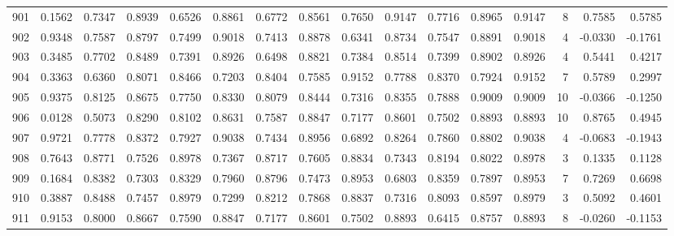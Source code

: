 \begin{tabular}{lrrrrrrrrrrrrrrr}
901 &      0.1562 &  0.7347 &  0.8939 &  0.6526 &  0.8861 &  0.6772 &  0.8561 &  0.7650 &  0.9147 &  0.7716 &   0.8965 &     0.9147 &      8 &                    0.7585 &                     0.5785 \\
902 &      0.9348 &  0.7587 &  0.8797 &  0.7499 &  0.9018 &  0.7413 &  0.8878 &  0.6341 &  0.8734 &  0.7547 &   0.8891 &     0.9018 &      4 &                   -0.0330 &                    -0.1761 \\
903 &      0.3485 &  0.7702 &  0.8489 &  0.7391 &  0.8926 &  0.6498 &  0.8821 &  0.7384 &  0.8514 &  0.7399 &   0.8902 &     0.8926 &      4 &                    0.5441 &                     0.4217 \\
904 &      0.3363 &  0.6360 &  0.8071 &  0.8466 &  0.7203 &  0.8404 &  0.7585 &  0.9152 &  0.7788 &  0.8370 &   0.7924 &     0.9152 &      7 &                    0.5789 &                     0.2997 \\
905 &      0.9375 &  0.8125 &  0.8675 &  0.7750 &  0.8330 &  0.8079 &  0.8444 &  0.7316 &  0.8355 &  0.7888 &   0.9009 &     0.9009 &     10 &                   -0.0366 &                    -0.1250 \\
906 &      0.0128 &  0.5073 &  0.8290 &  0.8102 &  0.8631 &  0.7587 &  0.8847 &  0.7177 &  0.8601 &  0.7502 &   0.8893 &     0.8893 &     10 &                    0.8765 &                     0.4945 \\
907 &      0.9721 &  0.7778 &  0.8372 &  0.7927 &  0.9038 &  0.7434 &  0.8956 &  0.6892 &  0.8264 &  0.7860 &   0.8802 &     0.9038 &      4 &                   -0.0683 &                    -0.1943 \\
908 &      0.7643 &  0.8771 &  0.7526 &  0.8978 &  0.7367 &  0.8717 &  0.7605 &  0.8834 &  0.7343 &  0.8194 &   0.8022 &     0.8978 &      3 &                    0.1335 &                     0.1128 \\
909 &      0.1684 &  0.8382 &  0.7303 &  0.8329 &  0.7960 &  0.8796 &  0.7473 &  0.8953 &  0.6803 &  0.8359 &   0.7897 &     0.8953 &      7 &                    0.7269 &                     0.6698 \\
910 &      0.3887 &  0.8488 &  0.7457 &  0.8979 &  0.7299 &  0.8212 &  0.7868 &  0.8837 &  0.7316 &  0.8093 &   0.8597 &     0.8979 &      3 &                    0.5092 &                     0.4601 \\
911 &      0.9153 &  0.8000 &  0.8667 &  0.7590 &  0.8847 &  0.7177 &  0.8601 &  0.7502 &  0.8893 &  0.6415 &   0.8757 &     0.8893 &      8 &                   -0.0260 &                    -0.1153 \\

\end{tabular}
